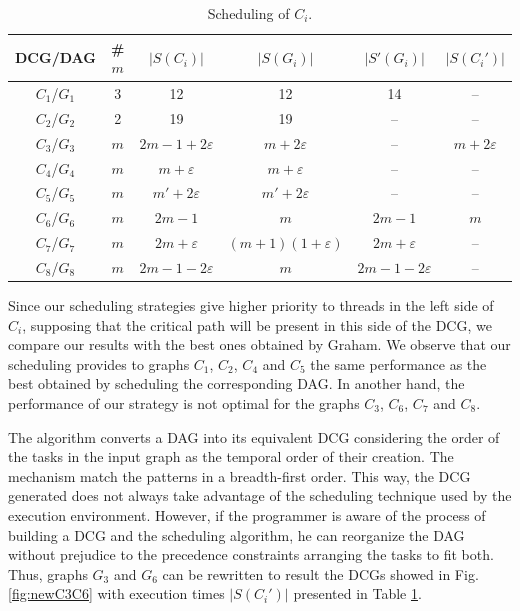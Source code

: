 \documentclass[twocolumn]{svjour3}
\begin{document}
\begin{table}
\begin{center}
\caption{Scheduling of $C_i$.}\label{tab:resultados}
\begin{tabular}{c|c||c||c|c||c}
DCG/DAG & \# $m$ & $|S(C_i)|$ & $|S(G_i)|$ & $|S'(G_i)|$ & $|S(C_i')|$\\ \hline\hline
$C_1$/$G_1$ &  3  & 12 & 12 & 14 & --\\ \hline
$C_2$/$G_2$ &  2  & 19 & 19 & -- & --\\ \hline
$C_3$/$G_3$ & $m$ & $2m-1+2\varepsilon$ & $m+2\varepsilon$ & -- & $m+2\varepsilon$ \\ \hline
$C_4$/$G_4$ & $m$ & $m+\varepsilon$ & $m+\varepsilon$ & -- & --\\ \hline
$C_5$/$G_5$ & $m$ & $m'+2\varepsilon$ & $m'+2\varepsilon$  & -- & --\\ \hline
$C_6$/$G_6$ & $m$ & $2m-1$ & $m$ & $2m-1$ & $m$\\ \hline
$C_7$/$G_7$ & $m$ & $2m+\varepsilon$ & $(m+1)(1+\varepsilon)$ & $2m+\varepsilon$ & --\\ \hline
$C_8$/$G_8$ & $m$ & $2m-1-2\varepsilon$ & $m$ & $2m-1-2\varepsilon$ & --\\ \hline
\end{tabular}
\end{center}
\end{table}

Since our scheduling strategies give higher priority to threads in the left side of $C_i$, supposing that the {\color{blue}critical path} will be present in this side of the DCG, we compare our results with the best ones obtained by Graham. We observe that our scheduling provides to graphs $C_1$, $C_2$, $C_4$ and $C_5$ the same performance as the best obtained by scheduling the corresponding DAG. In another hand, the performance of our strategy is not optimal for the graphs $C_3$, $C_6$, $C_7$ and $C_8$.

The algorithm converts a DAG into its equivalent DCG considering the order of the tasks in the input graph as the temporal order of their creation. The mechanism match the patterns in a breadth-first order. This way, the DCG generated does not always take advantage of the scheduling technique used by the execution environment. However, if the programmer is aware of the process of building a DCG and the scheduling algorithm, he can reorganize the DAG without prejudice to the precedence constraints arranging the tasks to fit both. Thus, graphs $G_3$ and $G_6$ can be rewritten to result the DCGs showed in Fig. \ref{fig:newC3C6} with execution times $|S(C_i')|$ presented in Table \ref{tab:resultados}.
\end{document}
